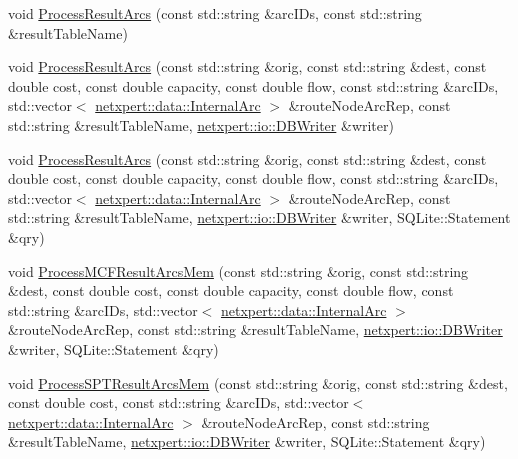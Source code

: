 \begin{DoxyCompactItemize}
\item 
void \hyperlink{classnetxpert_1_1Network_ab36ee35753add26a593e04e3c1ebff70}{Process\+Result\+Arcs} (const std\+::string \&arc\+I\+Ds, const std\+::string \&result\+Table\+Name)
\item 
void \hyperlink{classnetxpert_1_1Network_ab14f118e08f98b6993c8ae374a44e547}{Process\+Result\+Arcs} (const std\+::string \&orig, const std\+::string \&dest, const double cost, const double capacity, const double flow, const std\+::string \&arc\+I\+Ds, std\+::vector$<$ \hyperlink{structnetxpert_1_1data_1_1InternalArc}{netxpert\+::data\+::\+Internal\+Arc} $>$ \&route\+Node\+Arc\+Rep, const std\+::string \&result\+Table\+Name, \hyperlink{classnetxpert_1_1io_1_1DBWriter}{netxpert\+::io\+::\+D\+B\+Writer} \&writer)
\item 
void \hyperlink{classnetxpert_1_1Network_ae0b32b0fc1e0e872a4c076582ea518d6}{Process\+Result\+Arcs} (const std\+::string \&orig, const std\+::string \&dest, const double cost, const double capacity, const double flow, const std\+::string \&arc\+I\+Ds, std\+::vector$<$ \hyperlink{structnetxpert_1_1data_1_1InternalArc}{netxpert\+::data\+::\+Internal\+Arc} $>$ \&route\+Node\+Arc\+Rep, const std\+::string \&result\+Table\+Name, \hyperlink{classnetxpert_1_1io_1_1DBWriter}{netxpert\+::io\+::\+D\+B\+Writer} \&writer, S\+Q\+Lite\+::\+Statement \&qry)
\item 
void \hyperlink{classnetxpert_1_1Network_ac6a237484149c6b51c93b6f380405693}{Process\+M\+C\+F\+Result\+Arcs\+Mem} (const std\+::string \&orig, const std\+::string \&dest, const double cost, const double capacity, const double flow, const std\+::string \&arc\+I\+Ds, std\+::vector$<$ \hyperlink{structnetxpert_1_1data_1_1InternalArc}{netxpert\+::data\+::\+Internal\+Arc} $>$ \&route\+Node\+Arc\+Rep, const std\+::string \&result\+Table\+Name, \hyperlink{classnetxpert_1_1io_1_1DBWriter}{netxpert\+::io\+::\+D\+B\+Writer} \&writer, S\+Q\+Lite\+::\+Statement \&qry)
\item 
void \hyperlink{classnetxpert_1_1Network_a3a51b523d6bd652b0f1c81c69a165d8f}{Process\+S\+P\+T\+Result\+Arcs\+Mem} (const std\+::string \&orig, const std\+::string \&dest, const double cost, const std\+::string \&arc\+I\+Ds, std\+::vector$<$ \hyperlink{structnetxpert_1_1data_1_1InternalArc}{netxpert\+::data\+::\+Internal\+Arc} $>$ \&route\+Node\+Arc\+Rep, const std\+::string \&result\+Table\+Name, \hyperlink{classnetxpert_1_1io_1_1DBWriter}{netxpert\+::io\+::\+D\+B\+Writer} \&writer, S\+Q\+Lite\+::\+Statement \&qry)
\item 

\end{DoxyCompactItemize}

